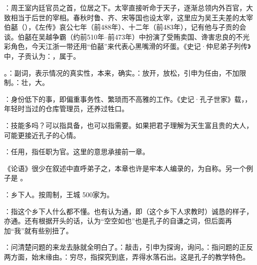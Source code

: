 {
\item {}：周王室内廷官员之首，位居之下。太宰直接听命于天子，逐渐总领内外百官，大致相当于后世的宰相。春秋时鲁、齐、宋等国也设太宰，这里应为吴王夫差的太宰伯嚭（），《左传》哀公七年（前488年）、十二年（前483年），记有他与子贡的会谈。伯嚭在吴越争霸（约前510年--前473年）中扮演了受贿卖国、谗害忠良的不光彩角色，今天江浙一带还用“伯嚭”来代表心黑嘴滑的坏蛋。《史记·仲尼弟子列传》中，子贡认为：，属于。

\item {}。：副词，表示情况的真实性，本来，确实。：放开，放松，引申为任由，不加限制。：壮，大。

\item {}：身份低下的事，即偏重事务性、繁琐而不高雅的工作。《史记·孔子世家》载，，年轻时当过的仓库管理员，还养过牲口。

\item {}：技能多吗？可以指具备，也可以指需要。如果把君子理解为天生富且贵的大人，可能更接近孔子的心情。
}
{}


{
\begin{lyblobitemize}
\item {}：任用，指任职为官。这里的意思承接前一章。
\end{lyblobitemize}
《论语》很少在叙述中直呼弟子之，本章也许是牢本人编录的，为自称。另一个例子是  。
}
{}


{
\item {}：乡下人。按周制，王城 500家为。
\item {}：指这个乡下人什么都不懂。也有认为通，即（这个乡下人求教时）诚恳的样子，亦通。还有根据开头的话，认为“空空如也”也是孔子的自谦之词，但后面再加“我”就有些别扭了。
\item {}：问清楚问题的来龙去脉就全明白了。：敲击，引申为探询，询问。：指问题的正反两方面，始末缘由。：穷尽，指探究到底，弄得水落石出。这是孔子的教学特色。
}
{}


